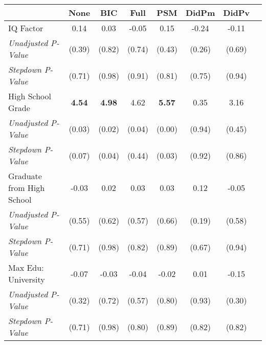 \begin{tabular}{l c c c c c c c}
\toprule
 & None & BIC & Full & PSM & DidPm & DidPv \\
\midrule
IQ Factor & 0.14 & 0.03 & -0.05 & 0.15 & -0.24 & -0.11 \\
\quad \textit{Unadjusted P-Value} & (0.39) & (0.82) & (0.74) & (0.43) & (0.26) & (0.69) \\
\quad \textit{Stepdown P-Value} & (0.71) & (0.98) & (0.91) & (0.81) & (0.75) & (0.94) \\
High School Grade & \textbf{ 4.54 } & \textbf{ 4.98 } & 4.62 & \textbf{ 5.57 } & 0.35 & 3.16 \\
\quad \textit{Unadjusted P-Value} & (0.03) & (0.02) & (0.04) & (0.00) & (0.94) & (0.45) \\
\quad \textit{Stepdown P-Value} & (0.07) & (0.04) & (0.44) & (0.03) & (0.92) & (0.86) \\
Graduate from High School & -0.03 & 0.02 & 0.03 & 0.03 & 0.12 & -0.05 \\
\quad \textit{Unadjusted P-Value} & (0.55) & (0.62) & (0.57) & (0.66) & (0.19) & (0.58) \\
\quad \textit{Stepdown P-Value} & (0.71) & (0.98) & (0.82) & (0.89) & (0.67) & (0.94) \\
Max Edu: University & -0.07 & -0.03 & -0.04 & -0.02 & 0.01 & -0.15 \\
\quad \textit{Unadjusted P-Value} & (0.32) & (0.72) & (0.57) & (0.80) & (0.93) & (0.30) \\
\quad \textit{Stepdown P-Value} & (0.71) & (0.98) & (0.80) & (0.89) & (0.82) & (0.82) \\
\bottomrule
\end{tabular}
